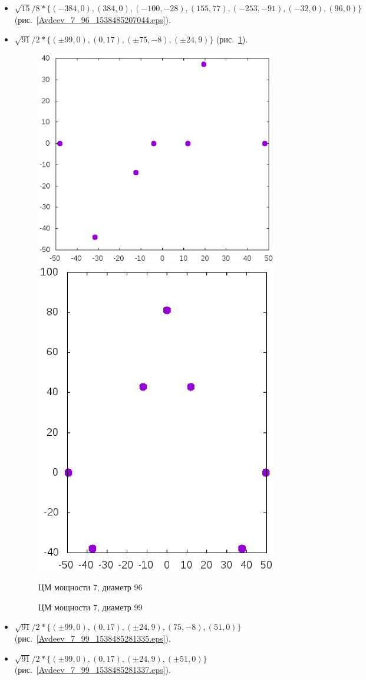 \documentclass[12pt]{article}
\begin{document}
\begin{itemize}
\item
$
\sqrt{15}/8 *
\{
( -384 , 0),
( 384 , 0),
( -100 , -28),
( 155 , 77),
( -253 , -91),
( -32 , 0),
( 96 , 0)
\}
$
(рис.~\ref{Avdeev_7_96_1538485207044.eps}).


\item
$
\sqrt{91}/2 *
\{
( \pm99 , 0),
( 0 , 17),
( \pm75 , -8),
( \pm24 , 9)
\}
$
(рис.~\ref{Avdeev_7_99_1538485281307.eps}).


\begin{figure}[htbp]
	\includegraphics[width=.48\linewidth]{Avdeev_7_96_1538485207044.eps}
	\hfill
	\includegraphics[width=.48\linewidth]{Avdeev_7_99_1538485281307.eps}
	\\
	\parbox{.48\linewidth}{\caption{ЦМ мощности 7, диаметр 96}\label{Avdeev_7_96_1538485207044.eps}}
	\hfill
	\parbox{.48\linewidth}{\caption{ЦМ мощности 7, диаметр 99}\label{Avdeev_7_99_1538485281307.eps}}
\end{figure}


\item
$
\sqrt{91}/2 *
\{
( \pm99 , 0),
( 0 , 17),
( \pm24 , 9),
( 75 , -8),
( 51 , 0)
\}
$
(рис.~\ref{Avdeev_7_99_1538485281335.eps}).

\item
$
\sqrt{91}/2 *
\{
( \pm99 , 0),
( 0 , 17),
( \pm24 , 9),
( \pm51 , 0)
\}
$
(рис.~\ref{Avdeev_7_99_1538485281337.eps}).



\end{itemize}
\end{document}
